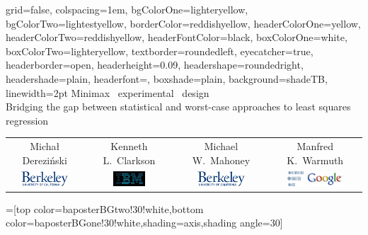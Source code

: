 \documentclass[portrait,paperwidth=24in,paperheight=36in,fontscale=0.4]{baposter} %
\let\polishl\l
\begin{document}
\newlength{\leftimgwidth}
\begin{poster}%
  {
  grid=false,
  colspacing=1em,
  bgColorOne=lighteryellow,
  bgColorTwo=lightestyellow,
  borderColor=reddishyellow,
  headerColorOne=yellow,
  headerColorTwo=reddishyellow,
  headerFontColor=black,
  boxColorOne=white,
  boxColorTwo=lighteryellow,
  textborder=roundedleft,
  eyecatcher=true,
  headerborder=open,
  headerheight=0.09\textheight,
  headershape=roundedright,
  headershade=plain,
  headerfont=\Large\textsf, %
  boxshade=plain,
  background=shadeTB,
  linewidth=2pt
  }
  {} %
  { \huge\sf
Minimax \ experimental \ design \\
\large Bridging  the  gap  between  statistical  and
 worst-case approaches  to
  least  squares  regression
    \vspace{.8em}}
{\sf
\begin{tabular}{c@{\qquad}c@{\qquad}c@{\qquad}c}
  Micha{\polishl} Derezi\'{n}ski
  & Kenneth L.~Clarkson
  & Michael W.~Mahoney
  & Manfred K.~Warmuth
  \\[1mm]
\includegraphics[height=1.5em]{../sty/Berkeley.png}
  &\includegraphics[height=1.5em]{../sty/IBM.png}
  & \includegraphics[height=1.5em]{../sty/Berkeley.png}
  & \includegraphics[height=1.5em,viewport=0 160 375 261,clip]{../sty/UCSC}
      \hspace{1mm}
	\includegraphics[height=1.5em] {../sty/Google.jpg}
\end{tabular}
\vspace{-1em} %
}
{}
=[top color=baposterBGtwo!30!white,bottom color=baposterBGone!30!white,shading=axis,shading angle=30]



\end{poster}
\end{document}
